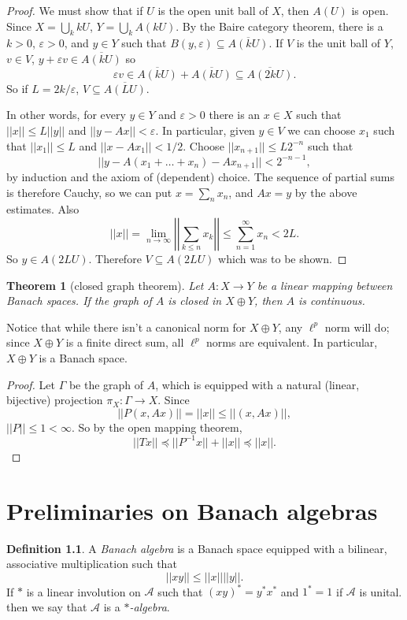\documentclass[12pt]{report}
\newcommand{\dfn}[1]{\emph{#1}\index{#1}}
\newtheorem{theorem}{Theorem}[chapter]
\theoremstyle{definition}
\newtheorem{definition}[theorem]{Definition}
\begin{document}
\begin{proof}
    We must show that if $U$ is the open unit ball of $X$, then $A(U)$ is open. Since $X = \bigcup_k kU$, $Y = \bigcup_k A(kU)$. By the Baire category theorem, there is a $k > 0$, $\varepsilon > 0$, and $y \in Y$ such that $B(y, \varepsilon) \subseteq \overline{A(kU)}$. If $V$ is the unit ball of $Y$, $v \in V$, $y+\varepsilon v \in \overline{A(kU)}$ so
    $$\varepsilon v \in \overline{A(kU)} + \overline{A(kU)} \subseteq \overline{A(2kU)}.$$
    So if $L = 2k/\varepsilon$, $V \subseteq \overline{A(LU)}$. 
    
    In other words, for every $y \in Y$ and $\varepsilon > 0$ there is an $x \in X$ such that $||x|| \leq L||y||$ and $||y-Ax|| < \varepsilon$. In particular, given $y \in V$ we can choose $x_1$ such that $||x_1|| \leq L$ and $||x-Ax_1|| < 1/2$. Choose $||x_{n+1}|| \leq L2^{-n}$ such that
    $$||y - A(x_1 + \dots + x_n) - Ax_{n+1}|| < 2^{-n-1},$$
    by induction and the axiom of (dependent) choice. The sequence of partial sums is therefore Cauchy, so we can put $x = \sum_n x_n$, and $Ax = y$ by the above estimates. Also
    $$||x|| = \lim_{n \to \infty} \left|\left| \sum_{k\leq n} x_k\right|\right| \leq \sum_{n=1}^\infty x_n < 2L.$$
    So $y \in A(2LU)$. Therefore $V \subseteq A(2LU)$ which was to be shown.
\end{proof}
\begin{theorem}[closed graph theorem]
    Let $A: X \to Y$ be a linear mapping between Banach spaces. If the graph of $A$ is closed in $X \oplus Y$, then $A$ is continuous.
\end{theorem}
    Notice that while there isn't a canonical norm for $X \oplus Y$, any $\ell^p$ norm will do; since $X \oplus Y$ is a finite direct sum, all $\ell^p$ norms are equivalent. In particular, $X \oplus Y$ is a Banach space.
\begin{proof}
    Let $\Gamma$ be the graph of $A$, which is equipped with a natural (linear, bijective) projection $\pi_X: \Gamma \to X$. Since
    $$||P(x, Ax)|| = ||x|| \leq ||(x, Ax)||,$$
    $||P|| \leq 1 < \infty$. So by the open mapping theorem,
    $$||Tx|| \preceq ||P^{-1}x|| + ||x|| \preceq ||x||.$$
\end{proof}

\chapter{Preliminaries on Banach algebras}
\begin{definition}
A \dfn{Banach algebra} is a Banach space equipped with a bilinear, associative multiplication such that
$$||xy|| \leq ||x|| ||y||.$$
If $*$ is a linear involution on $\mathcal A$ such that $(xy)^* = y^*x^*$ and $1^*= 1$ if $\mathcal A$ is unital. then we say that $\mathcal A$ is a \emph{$*$-algebra}.
\end{definition}
\end{document}
